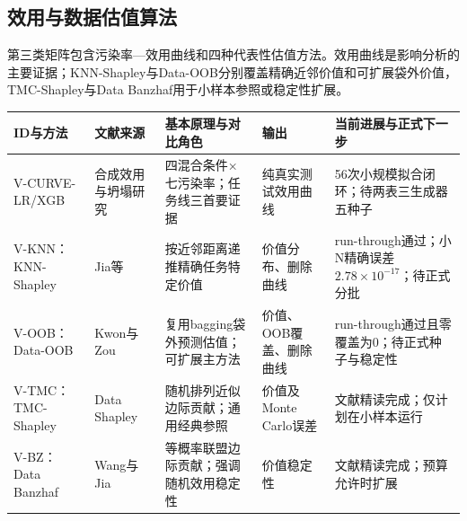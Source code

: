\documentclass[
  chinese,
  12pt,
  a4paper,
  chinese,
  UTF8]{ctexart}
\begin{document}
\subsection{效用与数据估值算法}\label{ux6548ux7528ux4e0eux6570ux636eux4f30ux503cux7b97ux6cd5}

第三类矩阵包含污染率---效用曲线和四种代表性估值方法。效用曲线是影响分析的主要证据；KNN-Shapley与Data-OOB分别覆盖精确近邻价值和可扩展袋外价值，TMC-Shapley与Data
Banzhaf用于小样本参照或稳定性扩展。

\begin{longtable}[]{@{}
  >{\raggedright\arraybackslash}p{}
  >{\raggedright\arraybackslash}p{}
  >{\raggedright\arraybackslash}p{}
  >{\raggedright\arraybackslash}p{}
  >{\raggedright\arraybackslash}p{}@{}}
\toprule\noalign{}
\begin{minipage}[b]{\linewidth}\raggedright
ID与方法
\end{minipage} & \begin{minipage}[b]{\linewidth}\raggedright
文献来源
\end{minipage} & \begin{minipage}[b]{\linewidth}\raggedright
基本原理与对比角色
\end{minipage} & \begin{minipage}[b]{\linewidth}\raggedright
输出
\end{minipage} & \begin{minipage}[b]{\linewidth}\raggedright
当前进展与正式下一步
\end{minipage} \\
\midrule\noalign{}
\endhead
\bottomrule\noalign{}
\endlastfoot
V-CURVE-LR/XGB &
合成效用与坍塌研究\autocite{snoke2018pmse,shumailov2024collapse,kazdan2025thrive}
& 四混合条件×七污染率；任务线三首要证据 & 纯真实测试效用曲线 &
56次小规模拟合闭环；待两表三生成器五种子 \\
V-KNN：KNN-Shapley & Jia等\autocite{jia2019knn} &
按近邻距离递推精确任务特定价值 & 价值分布、删除曲线 &
run-through通过；小N精确误差\(2.78\times10^{-17}\)；待正式分批 \\
V-OOB：Data-OOB & Kwon与Zou\autocite{kwon2023dataoob} &
复用bagging袋外预测估值；可扩展主方法 & 价值、OOB覆盖、删除曲线 &
run-through通过且零覆盖为0；待正式种子与稳定性 \\
V-TMC：TMC-Shapley & Data Shapley\autocite{ghorbani2019datashapley} &
随机排列近似边际贡献；通用经典参照 & 价值及Monte Carlo误差 &
文献精读完成；仅计划在小样本运行 \\
V-BZ：Data Banzhaf & Wang与Jia\autocite{wang2023banzhaf} &
等概率联盟边际贡献；强调随机效用稳定性 & 价值稳定性 &
文献精读完成；预算允许时扩展 \\
\end{longtable}
\end{document}
